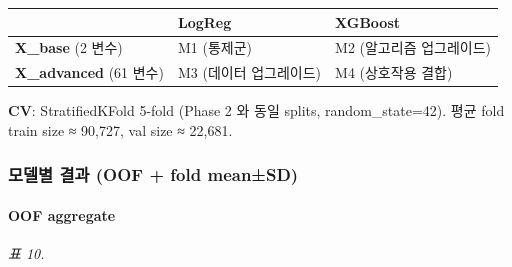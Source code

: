 \documentclass[
  11.5pt,
]{article}
\begin{document}
\begin{longtable}[]{@{}
  >{\raggedright\arraybackslash}p{}
  >{\raggedright\arraybackslash}p{}
  >{\raggedright\arraybackslash}p{}@{}}
\toprule\noalign{}
\begin{minipage}[b]{\linewidth}\raggedright
\end{minipage} & \begin{minipage}[b]{\linewidth}\raggedright
LogReg
\end{minipage} & \begin{minipage}[b]{\linewidth}\raggedright
XGBoost
\end{minipage} \\
\midrule\noalign{}
\endhead
\bottomrule\noalign{}
\endlastfoot
\textbf{X\_base} (2 변수) & M1 (통제군) & M2 (알고리즘 업그레이드) \\
\textbf{X\_advanced} (61 변수) & M3 (데이터 업그레이드) & M4 (상호작용
결합) \\
\end{longtable}

\textbf{CV}: StratifiedKFold 5-fold (Phase 2 와 동일 splits,
random\_state=42). 평균 fold train size ≈ 90,727, val size ≈ 22,681.

\subsubsection{모델별 결과 (OOF + fold
mean±SD)}\label{uxbaa8uxb378uxbcc4-uxacb0uxacfc-oof-fold-meansd}

\paragraph{OOF aggregate}\label{oof-aggregate}

\emph{표 10.}
\end{document}
